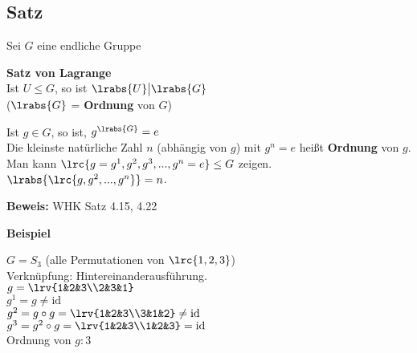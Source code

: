 	\subsection{Satz}
	
	Sei $G$ eine endliche Gruppe
		\item \textbf{Satz von Lagrange}\\
		Ist $U\leq G$, so ist $\lrabs{U}\big|\lrabs{G}$\\
		($\lrabs{G}$ = \textbf{Ordnung} von $G$)
		
		\item Ist $g\in G$, so ist, $g^{\lrabs{G}}=e$\\
		Die kleinste natürliche Zahl $n$ (abhängig von $g$) mit $g^n=e$ heißt \textbf{Ordnung} von $g$.\\
		Man kann $\lrc{g=g^1,g^2,g^3,...,g^n=e}\leq G$ zeigen.\\
		$\lrabs{\lrc{g,g^2,...,g^n}}=n$.
		
		\textbf{Beweis:} WHK Satz 4.15, 4.22
		
		\textbf{Beispiel}
		
		$G=S_3$ (alle Permutationen von $\lrc{1,2,3}$)\\
		Verknüpfung: Hintereinanderausführung.\\
		$g=\lrv{1&2&3\\2&3&1}$ \\
		$g^1 = g \neq\mbox{id}$ \\
		$g^2 = g\circ g =\lrv{1&2&3\\3&1&2}\neq\mbox{id}$\\
		$g^3 = g^2\circ g =\lrv{1&2&3\\1&2&3}=\mbox{id}$\\
		Ordnung von $g: 3$
	\subExEnd
